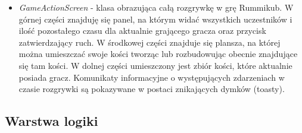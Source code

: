 \begin{itemize}
	\item \emph{GameActionScreen} - klasa obrazująca całą rozgrywkę w grę Rummikub. W górnej części znajduję się panel, na którym widać wszystkich uczestników i ilość pozostałego czasu dla aktualnie grającego gracza oraz przycisk zatwierdzający ruch. W środkowej części znajduje się plansza, na której można umieszczać swoje kości tworząc lub rozbudowując obecnie znajdujące się tam kości. W dolnej części umieszczony jest zbiór kości, które aktualnie posiada gracz. Komunikaty informacyjne o występujących zdarzeniach w czasie rozgrywki są pokazywane w postaci znikających dymków (toasty). 
\end{itemize}

\subsection{Warstwa logiki}


